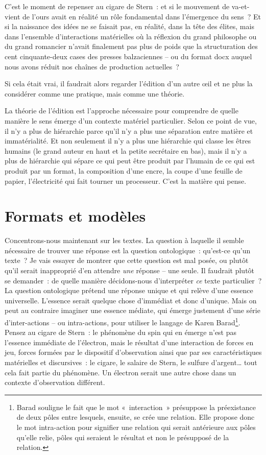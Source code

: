 C'est le moment de repenser au cigare de Stern~: et si le mouvement de
va-et-vient de l'ours avait en réalité un rôle fondamental dans
l'émergence du sens~? Et si la naissance des idées ne se faisait pas, en
réalité, dans la tête des élites, mais dans l'ensemble d'interactions
matérielles où la réflexion du grand philosophe ou du grand romancier
n'avait finalement pas plus de poids que la structuration des cent
cinquante-deux cases des presses balzaciennes -- ou du format docx
auquel nous avons réduit nos chaînes de production actuelles~?

Si cela était vrai, il faudrait alors regarder l'édition d'un autre
\oe il et ne plus la considérer comme une pratique, mais comme une
théorie.

La théorie de l'édition est l'approche nécessaire pour comprendre de
quelle manière le sens émerge d'un contexte matériel particulier. Selon
ce point de vue, il n'y a plus de hiérarchie parce qu'il n'y a plus une
séparation entre matière et immatérialité. Et non seulement il n'y a
plus une hiérarchie qui classe les êtres humains (le grand auteur en
haut et la petite secrétaire en bas), mais il n'y a plus de hiérarchie
qui sépare ce qui peut être produit par l'humain de ce qui est produit
par un format, la composition d'une encre, la coupe d'une feuille de
papier, l'électricité qui fait tourner un processeur. C'est la matière
qui pense.

\hypertarget{formats-et-moduxe8les}{%
\chapter{Formats et modèles}\label{formats-et-moduxe8les}}

\lettrine{C}oncentrons-nous maintenant sur les textes. La question à
laquelle il semble nécessaire de trouver une réponse est la question
ontologique~: qu'est-ce qu'un texte~? Je vais essayer de montrer que
cette question est mal posée, ou plutôt qu'il serait inapproprié d'en
attendre \emph{une} réponse -- une seule. Il faudrait plutôt se
demander~: de quelle manière décidons-nous d'interpréter \emph{ce} texte
particulier~? La question ontologique prétend une réponse unique et qui
relève d'une essence universelle. L'essence serait quelque chose
d'immédiat et donc d'unique. Mais on peut au contraire imaginer une
essence médiate, qui émerge justement d'une série d'inter-actions -- ou
intra-actions, pour utiliser le langage de Karen Barad\footnote{Barad
  souligne le fait que le mot «~interaction~» présuppose la préexistance
  de deux pôles entre lesquels, ensuite, se crée une relation. Elle
  propose donc le mot intra-action pour signifier une relation qui
  serait antérieure aux pôles qu'elle relie, pôles qui seraient le
  résultat et non le présupposé de la relation.}. Pensez au cigare de
Stern~: le phénomène du spin qui en émerge n'est pas l'essence immédiate
de l'électron, mais le résultat d'une interaction de forces en jeu,
forces formées par le dispositif d'observation ainsi que par ses
caractéristiques matérielles et discursives~: le cigare, le salaire de
Stern, le sulfure d'argent\ldots{} tout cela fait partie du phénomène.
Un électron serait une autre chose dans un contexte d'observation
différent.

